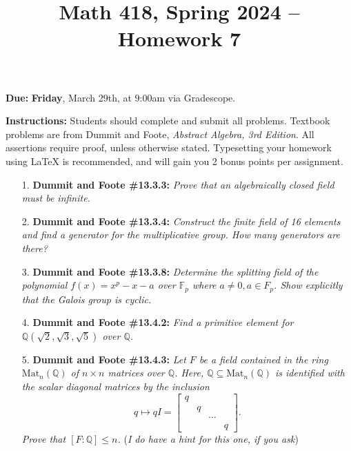 \documentclass[12pt]{article}
\title{Math 418, Spring 2024 -- Homework 7}
\date{}
\newcommand{\Q}{\mathbb{Q}}
\newcommand{\F}{\mathbb{F}}
\newcommand{\Mat}{\text{Mat}}
\begin{document}
 \maketitle
\vspace{-80pt}

\textbf{Due:} \textbf{Friday}, March 29th, at 9:00am via Gradescope.

\textbf{Instructions:} Students should complete and submit all problems. Textbook problems are from Dummit and Foote, \emph{Abstract Algebra, 3rd Edition}. All assertions require proof, unless otherwise stated. Typesetting your homework using LaTeX is recommended, and will gain you 2 bonus points per assignment.

\begin{enumerate}


\item[1.] \textbf{Dummit and Foote \#13.3.3:} \textit{Prove that an algebraically closed field must be infinite.}

\item[2.] \textbf{Dummit and Foote \#13.3.4:} \textit{Construct the finite field of 16 elements and find a generator for the multiplicative group. How many generators are there?}

\item[3.] \textbf{Dummit and Foote \#13.3.8:} \textit{Determine the splitting field of the polynomial $f(x) = x^p - x - a$ over $\F_p$ where $a\ne 0, a\in F_p$. Show explicitly that the Galois group is cyclic.}

\item[4.] \textbf{Dummit and Foote \#13.4.2:} \textit{Find a primitive element for $\Q(\sqrt{2}, \sqrt{3}, \sqrt{5})$ over $\Q$.}

\item[5.] \textbf{Dummit and Foote \#13.4.3:} \textit{Let $F$ be a field contained in the ring $\Mat_n(\Q)$ of $n \times n$ matrices over $\Q$. Here, $\Q\subseteq \Mat_n(\Q)$ is identified with the scalar diagonal matrices by the inclusion \[q\mapsto qI = \begin{bmatrix} q &&& \\ &q&& \\ &&\cdots& \\ &&&q\end{bmatrix}.\] Prove that $[F : \Q] \le n$.} (\emph{I do have a hint for this one, if you ask})

\end{enumerate}
\end{document}

